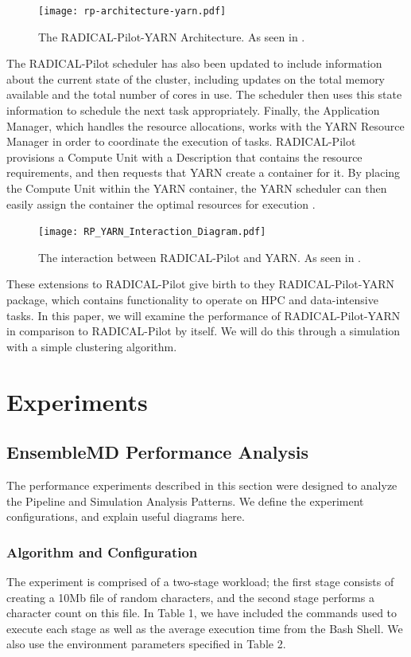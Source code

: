 \documentclass[]{article}
\begin{document}
		\begin{figure}[H]
			\centering
			\texttt{[image: rp-architecture-yarn.pdf]}
			\caption{The RADICAL-Pilot-YARN Architecture. As seen in \cite{hadoop_paper}.}
			\label{fig:rp_yarn_arch}
		\end{figure}

		The RADICAL-Pilot scheduler has also been updated to include information about the current state of the cluster, including updates on the total memory available and the total number of cores in use. The scheduler then uses this state information to schedule the next task appropriately. Finally, the Application Manager, which handles the resource allocations, works with the YARN Resource Manager in order to coordinate the execution of tasks. RADICAL-Pilot provisions a Compute Unit with a Description that contains the resource requirements, and then requests that YARN create a container for it. By placing the Compute Unit within the YARN container, the YARN scheduler can then easily assign the container the optimal resources for execution \cite{hadoop_paper}. 

		\begin{figure}[H]
			\centering
			\texttt{[image: RP\_YARN\_Interaction\_Diagram.pdf]}
			\caption{The interaction between RADICAL-Pilot and YARN. As seen in \cite{hadoop_paper}.}
			\label{fig:rp_yarn_interaction}
		\end{figure}

		These extensions to RADICAL-Pilot give birth to they RADICAL-Pilot-YARN package, which contains functionality to operate on HPC and data-intensive tasks. In this paper, we will examine the performance of RADICAL-Pilot-YARN in comparison to RADICAL-Pilot by itself. We will do this through a simulation with a simple clustering algorithm.

\section{Experiments}

	\subsection{EnsembleMD Performance Analysis}
		The performance experiments described in this section were designed to analyze the Pipeline and Simulation Analysis Patterns. We define the experiment configurations, and explain useful diagrams here.

		\subsubsection{Algorithm and Configuration}
			The experiment is comprised of a two-stage workload; the first stage consists of creating a 10Mb file of random characters, and the second stage performs a character count on this file. In Table 1, we have included the commands used to execute each stage as well as the average execution time from the Bash Shell. We also use the environment parameters specified in Table 2.
\end{document}
